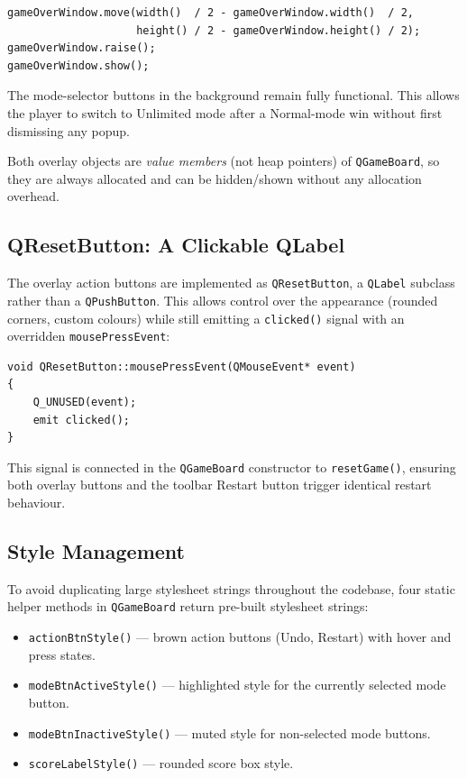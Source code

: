 \documentclass[a4paper,12pt]{article}
\begin{document}
\begin{lstlisting}[style=CppStyle, caption={Overlay positioning in \texttt{QGameBoard::notify()}}]
gameOverWindow.move(width()  / 2 - gameOverWindow.width()  / 2,
                    height() / 2 - gameOverWindow.height() / 2);
gameOverWindow.raise();
gameOverWindow.show();
\end{lstlisting}

The mode-selector buttons in the background remain fully functional. This allows the player to switch to Unlimited mode after a Normal-mode win without first dismissing any popup.

Both overlay objects are \emph{value members} (not heap pointers) of \texttt{QGameBoard}, so they are always allocated and can be hidden/shown without any allocation overhead.

\newpage

\subsection{QResetButton: A Clickable QLabel}

The overlay action buttons are implemented as \texttt{QResetButton}, a \texttt{QLabel} subclass rather than a \texttt{QPushButton}. This allows control over the appearance (rounded corners, custom colours) while still emitting a \texttt{clicked()} signal with an overridden \texttt{mousePressEvent}:

\begin{lstlisting}[style=CppStyle, caption={\texttt{QResetButton::mousePressEvent}}]
void QResetButton::mousePressEvent(QMouseEvent* event)
{
    Q_UNUSED(event);
    emit clicked();
}
\end{lstlisting}

This signal is connected in the \texttt{QGameBoard} constructor to \texttt{resetGame()}, ensuring both overlay buttons and the toolbar Restart button trigger identical restart behaviour.

\subsection{Style Management}

To avoid duplicating large stylesheet strings throughout the codebase, four static helper methods in \texttt{QGameBoard} return pre-built stylesheet strings:
\begin{itemize}
    \item \texttt{actionBtnStyle()} --- brown action buttons (Undo, Restart) with hover and press states.
    \item \texttt{modeBtnActiveStyle()} --- highlighted style for the currently selected mode button.
    \item \texttt{modeBtnInactiveStyle()} --- muted style for non-selected mode buttons.
    \item \texttt{scoreLabelStyle()} --- rounded score box style.
\end{itemize}
\end{document}
